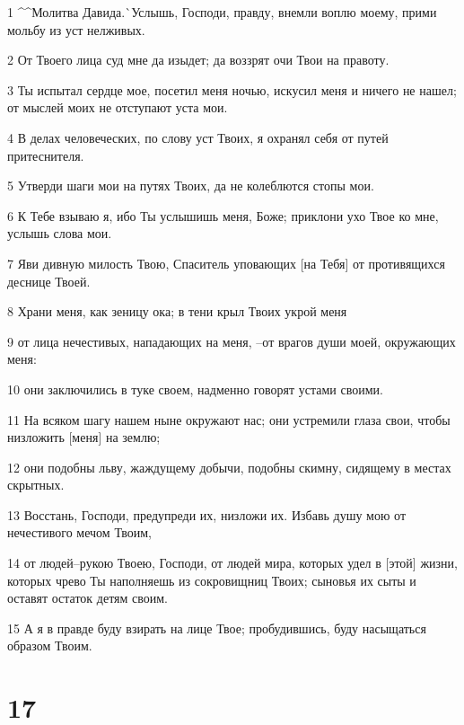 \par 1 ^^Молитва Давида.^^ Услышь, Господи, правду, внемли воплю моему, прими мольбу из уст нелживых.
\par 2 От Твоего лица суд мне да изыдет; да воззрят очи Твои на правоту.
\par 3 Ты испытал сердце мое, посетил меня ночью, искусил меня и ничего не нашел; от мыслей моих не отступают уста мои.
\par 4 В делах человеческих, по слову уст Твоих, я охранял себя от путей притеснителя.
\par 5 Утверди шаги мои на путях Твоих, да не колеблются стопы мои.
\par 6 К Тебе взываю я, ибо Ты услышишь меня, Боже; приклони ухо Твое ко мне, услышь слова мои.
\par 7 Яви дивную милость Твою, Спаситель уповающих [на Тебя] от противящихся деснице Твоей.
\par 8 Храни меня, как зеницу ока; в тени крыл Твоих укрой меня
\par 9 от лица нечестивых, нападающих на меня, --от врагов души моей, окружающих меня:
\par 10 они заключились в туке своем, надменно говорят устами своими.
\par 11 На всяком шагу нашем ныне окружают нас; они устремили глаза свои, чтобы низложить [меня] на землю;
\par 12 они подобны льву, жаждущему добычи, подобны скимну, сидящему в местах скрытных.
\par 13 Восстань, Господи, предупреди их, низложи их. Избавь душу мою от нечестивого мечом Твоим,
\par 14 от людей--рукою Твоею, Господи, от людей мира, которых удел в [этой] жизни, которых чрево Ты наполняешь из сокровищниц Твоих; сыновья их сыты и оставят остаток детям своим.
\par 15 А я в правде буду взирать на лице Твое; пробудившись, буду насыщаться образом Твоим.

\chapter{17}

